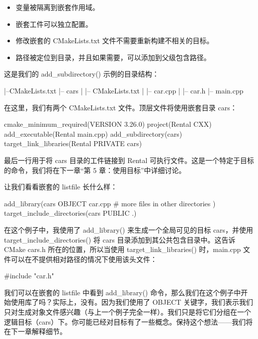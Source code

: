 \begin{itemize}
\item
变量被隔离到嵌套作用域。

\item
嵌套工件可以独立配置。

\item
修改嵌套的 CMakeLists.txt 文件不需要重新构建不相关的目标。

\item
路径被定位到目录，并且如果需要，可以添加到父级包含路径。
\end{itemize}

这是我们的 add\_subdirectory() 示例的目录结构：

\begin{shell}
|--CMakeLists.txt
|-- cars
|   |-- CMakeLists.txt
|   |-- car.cpp
|   |-- car.h
|-- main.cpp
\end{shell}

在这里，我们有两个 CMakeLists.txt 文件。顶层文件将使用嵌套目录 cars：


\begin{cmake}
cmake_minimum_required(VERSION 3.26.0)
project(Rental CXX)
add_executable(Rental main.cpp)
add_subdirectory(cars)
target_link_libraries(Rental PRIVATE cars)
\end{cmake}

最后一行用于将 cars 目录的工件链接到 Rental 可执行文件。这是一个特定于目标的命令，我们将在下一章“第 5 章：使用目标”中详细讨论。

让我们看看嵌套的 listfile 长什么样：


\begin{cmake}
add_library(cars OBJECT
    car.cpp
# more files in other directories
)
target_include_directories(cars PUBLIC .)
\end{cmake}

在这个例子中，我使用了 add\_library() 来生成一个全局可见的目标 cars，并使用 target\_include\_directories() 将 cars 目录添加到其公共包含目录中。这告诉 CMake cars.h 所在的位置，所以当使用 target\_link\_libraries() 时，main.cpp 文件可以在不提供相对路径的情况下使用该头文件：

\begin{cpp}
#include "car.h"
\end{cpp}

我们可以在嵌套的 listfile 中看到 add\_library() 命令，那么我们在这个例子中开始使用库了吗？实际上，没有。因为我们使用了 OBJECT 关键字，我们表示我们只对生成对象文件感兴趣（与上一个例子完全一样）。我们只是将它们分组在一个逻辑目标（cars）下。你可能已经对目标有了一些概念。保持这个想法——我们将在下一章解释细节。

